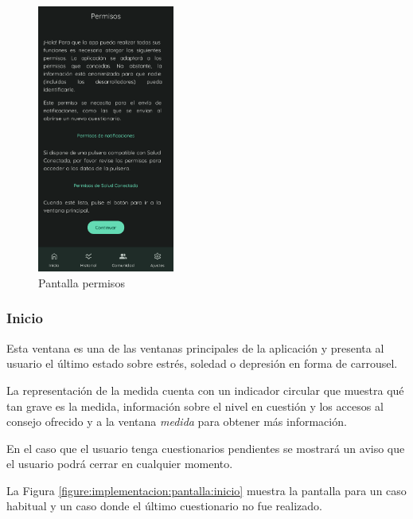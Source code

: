                \begin{figure}[h]
                	\centering
                	\includegraphics[width=0.4\textwidth]{figures/pantallas/Permisos.png}
                	\caption{Pantalla permisos}
                	\label{figure:implementacion:pantalla:permisos}
                \end{figure}
                
                \clearpage  %
            \subsubsection*{Inicio}

                Esta ventana es una de las ventanas principales de la aplicación y presenta al usuario el último estado sobre estrés, soledad o depresión en forma de carrousel. 
                
                La representación de la medida cuenta con un indicador circular que muestra qué tan grave es la medida, información sobre el nivel en cuestión y los accesos al consejo ofrecido y a la ventana \textit{medida} para obtener más información.

                En el caso que el usuario tenga cuestionarios pendientes se mostrará un aviso que el usuario podrá cerrar en cualquier momento.

                La Figura \ref{figure:implementacion:pantalla:inicio} muestra la pantalla para un caso habitual y un caso donde el último cuestionario no fue realizado.

